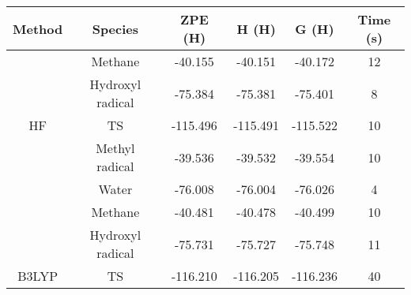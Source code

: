 
    \begin{tabular}{|c|c|c|c|c|c|}
    \hline
    \multicolumn{1}{|c|}{\textbf{Method}} &  \textbf{Species} &  \textbf{ZPE (H)} &  \textbf{H (H)} &  \textbf{G (H)} & \textbf{Time (s)}  \\ \hline
                                                                                   & Methane                              & -40.155                             & -40.151                            & -40.172                            & 12               \\ \hline
                                                                                   & Hydroxyl radical                     & -75.384                             & -75.381                            & -75.401                            & 8                \\ \hline
    \multicolumn{1}{|c|}{HF}                                                       & TS                                   & -115.496                            & -115.491                           & -115.522                           & 10               \\ \hline
                                                                                   & Methyl radical                       & -39.536                             & -39.532                            & -39.554                            & 10               \\ \hline
                                                                                   & Water                                & -76.008                             & -76.004                            & -76.026                            & 4                \\ \hline
                                                                                   & Methane                              & -40.481                             & -40.478                            & -40.499                            & 10               \\ \hline
                                                                                   & Hydroxyl radical                     & -75.731                             & -75.727                            & -75.748                            & 11               \\ \hline
    \multicolumn{1}{|c|}{B3LYP}                                                    & TS                                   & -116.210                            & -116.205                           & -116.236                           & 40               \\ \hline

\end{tabular}
